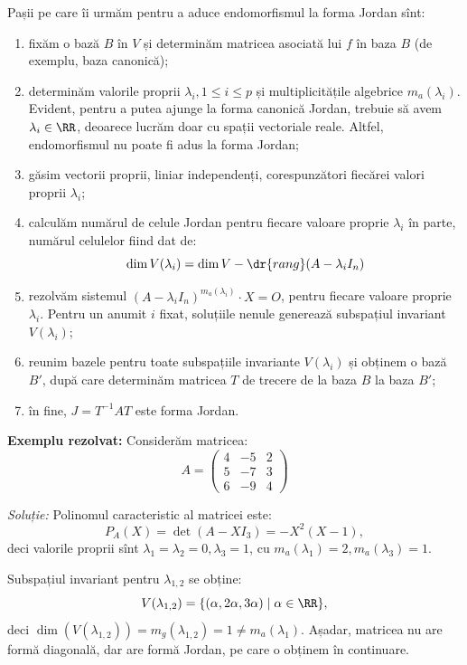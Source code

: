 Pașii pe care îi urmăm pentru a aduce endomorfismul la forma Jordan sînt:
\begin{enumerate}[(1)]
    \item fixăm o bază $ B $ în $ V $ și determinăm matricea asociată
        lui $ f $ în baza $ B $ (de exemplu, baza canonică);
    \item determinăm valorile proprii $ \lambda_i, 1 \leq i \leq p $ și
        multiplicitățile algebrice $ m_a(\lambda_i) $. Evident, pentru a
        putea ajunge la forma canonică Jordan, trebuie să avem
        $ \lambda_i \in \RR $, deoarece lucrăm doar cu spații vectoriale
        reale. Altfel, endomorfismul nu poate fi adus la forma Jordan;
    \item găsim vectorii proprii, liniar independenți, corespunzători 
        fiecărei valori proprii $ \lambda_i $;
    \item calculăm numărul de celule Jordan pentru fiecare valoare proprie
        $ \lambda_i $ în parte, numărul celulelor fiind dat de:
        \[
            \dim V(\lambda_i) = \dim V - \dr{rang}(A - \lambda_i I_n)
        \]
    \item rezolvăm sistemul $ (A - \lambda_i I_n)^{m_a(\lambda_i)} \cdot X = O $,
        pentru fiecare valoare proprie $ \lambda_i $. Pentru un anumit
        $ i $ fixat, soluțiile nenule generează subspațiul invariant $ V(\lambda_i) $;
    \item reunim bazele pentru toate subspațiile invariante $ V(\lambda_i) $
        și obținem o bază $ B' $, după care determinăm matricea $ T $
        de trecere de la baza $ B $ la baza $ B' $;
    \item în fine, $ J = T^{-1} A T $ este forma Jordan.
\end{enumerate}

\textbf{Exemplu rezolvat:} Considerăm matricea:
\[
    A = \begin{pmatrix}
        4 & -5 & 2 \\
        5 & -7 & 3 \\
        6 & -9 & 4
    \end{pmatrix}
\]

\emph{Soluție:} Polinomul caracteristic al matricei este:
\[
    P_A(X) = \det(A - XI_3) = -X^2(X - 1),
\]
deci valorile proprii sînt $ \lambda_1 = \lambda_2 = 0, \lambda_3 = 1 $,
cu $ m_a(\lambda_1) = 2, m_a(\lambda_3) = 1 $.

Subspațiul invariant pentru $ \lambda_{1,2} $ se obține:
\[
    V(\lambda_{1,2}) = \{ (\alpha, 2\alpha, 3\alpha) \mid \alpha \in \RR \},
\]
deci $ \dim(V(\lambda_{1,2})) = m_g(\lambda_{1,2}) = 1 \neq m_a(\lambda_1) $.
Așadar, matricea nu are formă diagonală, dar are formă Jordan, pe care o
obținem în continuare.

